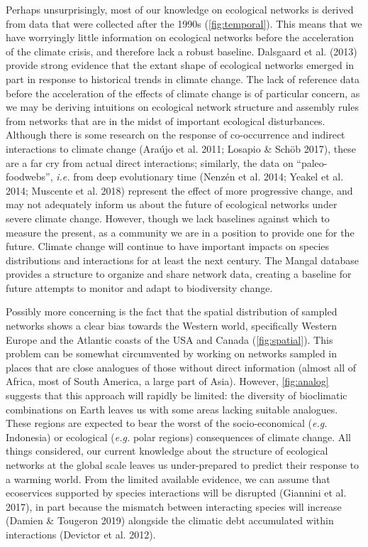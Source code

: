 Perhaps unsurprisingly, most of our knowledge on ecological networks is
derived from data that were collected after the 1990s
(\cref{fig:temporal}). This means that we have worryingly little
information on ecological networks before the acceleration of the
climate crisis, and therefore lack a robust baseline. Dalsgaard et al.
(2013) provide strong evidence that the extant shape of ecological
networks emerged in part in response to historical trends in climate
change. The lack of reference data before the acceleration of the
effects of climate change is of particular concern, as we may be
deriving intuitions on ecological network structure and assembly rules
from networks that are in the midst of important ecological
disturbances. Although there is some research on the response of
co-occurrence and indirect interactions to climate change (Araújo et al.
2011; Losapio \& Schöb 2017), these are a far cry from actual direct
interactions; similarly, the data on ``paleo-foodwebs'', \emph{i.e.}
from deep evolutionary time (Nenzén et al. 2014; Yeakel et al. 2014;
Muscente et al. 2018) represent the effect of more progressive change,
and may not adequately inform us about the future of ecological networks
under severe climate change. However, though we lack baselines against
which to measure the present, as a community we are in a position to
provide one for the future. Climate change will continue to have
important impacts on species distributions and interactions for at least
the next century. The Mangal database provides a structure to organize
and share network data, creating a baseline for future attempts to
monitor and adapt to biodiversity change.

Possibly more concerning is the fact that the spatial distribution of
sampled networks shows a clear bias towards the Western world,
specifically Western Europe and the Atlantic coasts of the USA and
Canada (\cref{fig:spatial}). This problem can be somewhat circumvented
by working on networks sampled in places that are close analogues of
those without direct information (almost all of Africa, most of South
America, a large part of Asia). However, \ref{fig:analog} suggests that
this approach will rapidly be limited: the diversity of bioclimatic
combinations on Earth leaves us with some areas lacking suitable
analogues. These regions are expected to bear the worst of the
socio-economical (\emph{e.g.} Indonesia) or ecological (\emph{e.g.}
polar regions) consequences of climate change. All things considered,
our current knowledge about the structure of ecological networks at the
global scale leaves us under-prepared to predict their response to a
warming world. From the limited available evidence, we can assume that
ecoservices supported by species interactions will be disrupted
(Giannini et al. 2017), in part because the mismatch between interacting
species will increase (Damien \& Tougeron 2019) alongside the climatic
debt accumulated within interactions (Devictor et al. 2012).

